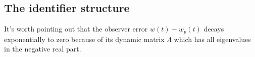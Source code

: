\subsection*{The identifier structure}
It's worth pointing out that the observer error $w(t)-w_p(t)$ decays exponentially to zero because of its dynamic matrix $\Lambda$ which has all eigenvalues in the negative real part. 
%

